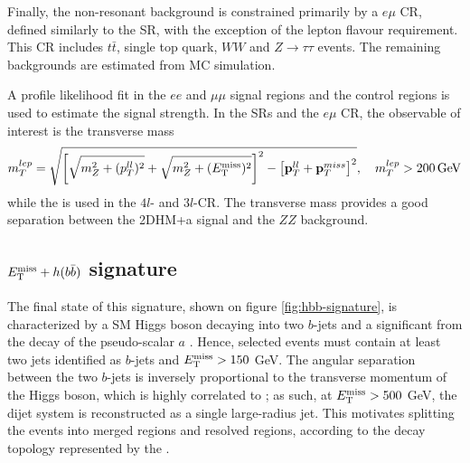 Finally, the non-resonant background is constrained primarily by a $e\mu$ CR, defined similarly to the SR, with the exception of the lepton flavour requirement. This CR includes $t\bar{t}$, single top quark, $WW$ and $Z\rightarrow \tau\tau$ events. The remaining backgrounds are estimated from MC simulation. 

A profile likelihood fit in the $ee$ and $\mu\mu$ signal regions and the control regions is used to estimate the signal strength. In the SRs and the $e\mu$ CR, the observable of interest is the transverse mass
\begin{equation}
    \label{4.9}
    m_T^{lep}=\sqrt{\left[ \sqrt{m_Z^2+(p_T^{ll})^2} + \sqrt{m_Z^2+ (E_{\mathrm{T}}^{\mathrm{miss}})^2} \right] ^2 - \left[ \mathbf{p}_T^{ll} + \mathbf{p}_T^{miss} \right]^2},\quad m_T^{lep}>200 \,\mathrm{GeV}
\end{equation}
while the \met is used in the $4l$- and $3l$-CR. The transverse mass provides a good separation between the 2DHM+a signal and the $ZZ$ background. 

\subsection{\texorpdfstring{$E_{\mathrm{T}}^{\mathrm{miss}}+h(b\bar{b})$}{TEXT} signature}

The final state of this signature, shown on figure \ref{fig:hbb-signature}, is characterized by a SM Higgs boson decaying into two $b$-jets and a significant \met from the decay of the pseudo-scalar $a$ \cite{EXOT-2018-46}. Hence, selected events must contain at least two jets identified as $b$-jets and $E_{\mathrm{T}}^{\mathrm{miss}}>150$ GeV. The angular separation between the two $b$-jets is inversely proportional to the transverse momentum of the Higgs boson, which is highly correlated to \met; as such, at $E_{\mathrm{T}}^{\mathrm{miss}}>500$ GeV, the dijet system is reconstructed as a single large-radius jet. This motivates splitting the events into merged regions and resolved regions, according to the decay topology represented by the \met. 

